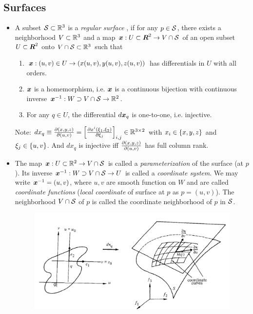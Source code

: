 \documentclass[11pt]{article}
\begin{document}
\subsection{Surfaces}
\begin{itemize}
\item \begin{definition}
A subset ${\mathcal S} \subset {\mathbb R}^{3}$ is a \emph{regular surface} \citep{do1976differential}, if for any $p\in {\mathcal S}$, there exists a neighborhood $V \subset {\mathbb R}^{3}$ and a map $\boldsymbol{x}: U \subset \boldsymbol{R}^{2} \rightarrow V\cap {\mathcal S}$ of an open subset $U\subset \boldsymbol{R}^{2}$ onto $V \cap {\mathcal S} \subset {\mathbb R}^{3}$ such that 
\begin{enumerate}
\item $\boldsymbol{x}:  (u,v) \in U \rightarrow  (x(u,v), y(u,v), z(u,v))$ has differentials in $U$ with all orders. 
\item $\boldsymbol{x}$ is a homemorphism, i.e. $\boldsymbol{x}$ is a continuous bijection with continuous inverse $\boldsymbol{x}^{-1}: W \supset V\cap {\mathcal S} \rightarrow {\mathbb R}^{2}$.
\item For any $q\in U$, the differential $d\boldsymbol{x}_{q}$ is one-to-one, i.e. injective.   
\end{enumerate}   
Note: $dx_{q} \equiv \frac{\partial (x,y,z)}{ \partial (u,v)} = \left[\frac{\partial x^{i}(\xi_{1},\xi_{2})}{ \partial \xi_{j}}\right]_{i,j} \in {\mathbb R}^{3\times 2}$ with $x_{i} \in \left\{x,y,z\right\}$ and $\xi_{j}\in \left\{u,v\right\}$. And $dx_{q}$ is injective iff $\frac{\partial (x,y,z)}{ \partial (u,v)}$ has full column rank. \\
\end{definition}

\item \begin{definition}
The map $\boldsymbol{x}: U\subset {\mathbb R}^{2} \rightarrow V\cap {\mathcal S}$ is called a \emph{parameterization} of the surface (at $p$). Its inverse $\boldsymbol{x}^{-1}: W\supset V\cap {\mathcal S} \rightarrow U$ is called a \emph{coordinate system}. We may write $\boldsymbol{x}^{-1} = (u, v)$, where $u,v$ are smooth function on $W$ and are called \emph{coordinate functions} (\emph{local coordinate} of surface at $p$ as $p= (u,v)$). The neighborhood $V\cap {\mathcal S}$ of $p$ is called the coordinate neighborhood of $p$ in ${\mathcal S}$. 
\end{definition}
\begin{figure}[htb]
\centering
\begin{minipage}{0.6\linewidth}
 \centerline{\includegraphics[scale = 0.5]{coordinate_curve.png}}
\end{minipage}
\end{figure}


\end{itemize}
\end{document}
